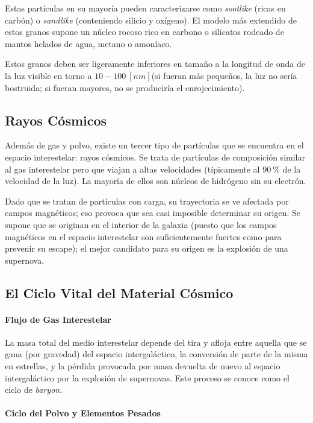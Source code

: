 \documentclass{tufte-handout}
\begin{document}
Estas partículas en su mayoría pueden caracterizarse como \emph{sootlike} (ricas en carbón) o \emph{sandlike} (conteniendo silicio y oxígeno). El modelo más extendido de estos granos supone un núcleo rocoso rico en carbono o silicatos rodeado de mantos helados de agua, metano o amoníaco.

Estos granos deben ser ligeramente inferiores en tamaño a la longitud de onda de la luz visible en torno a $10-100~[nm]$(si fueran más pequeños, la luz no sería bostruida; si fueran mayores, no se produciría el enrojecimiento).

\subsection{Rayos Cósmicos}

Además de gas y polvo, existe un tercer tipo de partículas que se encuentra en el espacio interestelar: rayos cósmicos. Se trata de partículas de composición similar al gas interestelar pero que viajan a altas velocidades (típicamente al $90~\%$ de la velocidad de la luz). La mayoría de ellos son núcleos de hidrógeno sin su electrón.

Dado que se tratan de partículas con carga, su trayectoria se ve afectada por campos magnéticos; eso provoca que sea casi imposible determinar su origen. Se supone que se originan en el interior de la galaxia (puesto que los campos magnéticos en el espacio interestelar son suficientemente fuertes como para prevenir su escape); el mejor candidato para su origen es la explosión de una supernova.

\subsection{El Ciclo Vital del Material Cósmico}

\paragraph{Flujo de Gas Interestelar}

La masa total del medio interestelar depende del tira y afloja entre aquella que se gana (por gravedad) del espacio intergaláctico, la conversión de parte de la misma en estrellas, y la pérdida provocada por masa devuelta de nuevo al espacio intergaláctico por la explosión de supernovas. Este proceso se conoce como el ciclo de \emph{baryon}.

\paragraph{Ciclo del Polvo y Elementos Pesados}
\end{document}
